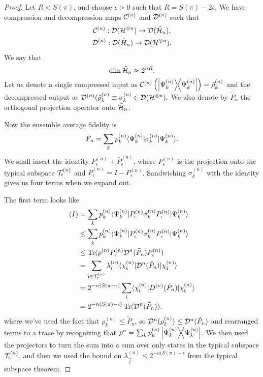 \begin{proof}
    Let $R<S(\pi)$, and choose $\epsilon >0$ such that $R=S(\pi)-2\epsilon$. We have compression and decompression maps $\mathcal{C}^{(n)}$ and $\mathcal{D}^{(n)}$
    such that
    \begin{gather}
        \mathcal{C}^{(n)}: \mathcal{D}(\mathcal H^{\otimes n})\to \mathcal{D}(\tilde {\mathcal H}_n),\\
        \mathcal{D}^{(n)}: \mathcal{D}(\tilde H_n) \to \mathcal{D}(\mathcal H^{\otimes n}).
    \end{gather}
    We say that
    \begin{equation}
        \dim \tilde {\mathcal H}_n \approx 2^{nR}.
    \end{equation}
    Let us denote a single compressed input as $\mathcal{C}^{(n)}\left(\left\lvert{\Psi_k^{(n)}}\middle\rangle\!\middle\langle{\Psi_k^{(n)}}\right\rvert\right)=\tilde \rho_k^{(n)}$ and the decompressed output as $\mathcal{D}^{(n)}(\tilde \rho_k^{(n)} \equiv \sigma_k^{(n)} \in \mathcal{D}(\mathcal H^{\otimes n}).$
    We also denote by $\tilde P_n$ the orthogonal projection operator onto $\tilde {\mathcal H}_n$.
    
    Now the ensemble average fidelity is
    \begin{equation}
        \bar F_n =\sum_k p_k^{(n)} \langle\Psi_k^{(n)}\rvert\sigma_k^{(n)} \lvert\Psi_k^{(n)}\rangle.
    \end{equation}
    We shall insert the identity $P_\epsilon^{(n)}+\bar P_\epsilon^{(n)}$, where $P_\epsilon^{(n)}$ is the projection onto the typical subspace $\mathcal T_\epsilon^{(n)}$ and $\bar P_\epsilon^{(n)}=I-P_\epsilon^{(n)}$. Sandwiching $\sigma_k^{(n)}$ with the identity gives us four terms when we expand out.
    
    The first term looks like
    \begin{align*}
        (I) &= \sum_k p_k^{(n)} \langle\Psi_k^{(n)}\rvert P_\epsilon^{(n)} \sigma_k^{(n)} P_\epsilon^{(n)} \lvert\Psi_k^{(n)}\rangle\\
            &\leq \sum_k p_k^{(n)} \langle\Psi_k^{(n)}\rvert P_\epsilon^{(n)} \sigma_k^{(n)} P_\epsilon^{(n)} \lvert\Psi_k^{(n)}\rangle\\
            &\leq\operatorname{Tr}(\rho^{(n)} P_\epsilon^{(n)} \mathcal{D}^{n}(\tilde P_n) P_\epsilon^{(n)})\\
            &= \sum_{\boldsymbol{\mathbf{i}} \in \mathcal T_{\epsilon}^{(n)}} \lambda_i^{(n)} \langle\chi_{\boldsymbol{\mathbf{i}}}^{(n)}\rvert \mathcal{D}^{n}(\tilde P_n) \lvert\chi_{\boldsymbol{\mathbf{i}}}^{(n)}\rangle\\
            &= 2^{-n(S(\pi-\epsilon)} \sum_i \langle\chi_{\boldsymbol{\mathbf{i}}}^{(n)}\rvert D^{(n)}(\tilde P_n)\lvert\chi_{\boldsymbol{\mathbf{i}}}^{(n)}\rangle\\
            &= 2^{-n(S(\pi)-\epsilon)} \operatorname{Tr}(\mathcal{D}^n(\tilde P_n)).
    \end{align*}
    where we've used the fact that $\rho_k^{(n)} \leq \tilde P_n$, so $\mathcal{D}^n(\rho_k^{(n)})\leq \mathcal{D}^n(\tilde P_n)$ and rearranged terms to a trace by recognizing that $\rho^n=\sum_k p_k^{(n)} \left\lvert{\Psi_k^{(n)}}\middle\rangle\!\middle\langle{\Psi_k^{(n)}}\right\rvert$. We then used the projectors to turn the sum into a sum over only states in the typical subspace $\mathcal T_\epsilon^{(n)}$, and then we used the bound on $\lambda_{\vec i}^{(n)}\leq 2^{-n(S(\pi)-\epsilon}$ from the typical subspace theorem.
    

\end{proof}
